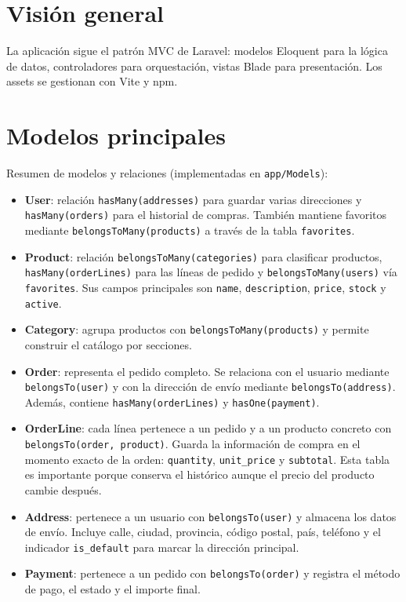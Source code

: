 \documentclass[12pt,a4paper]{report}
\begin{document}
\section{Visión general}

La aplicación sigue el patrón MVC de Laravel: modelos Eloquent para la lógica de datos, controladores para orquestación, vistas Blade para presentación. Los assets se gestionan con Vite y npm.

\section{Modelos principales}

Resumen de modelos y relaciones (implementadas en \texttt{app/Models}):

\begin{itemize}
  \item \textbf{User}: relación \texttt{hasMany(addresses)} para guardar varias direcciones y \texttt{hasMany(orders)} para el historial de compras. También mantiene favoritos mediante \texttt{belongsToMany(products)} a través de la tabla \texttt{favorites}.
  \item \textbf{Product}: relación \texttt{belongsToMany(categories)} para clasificar productos, \texttt{hasMany(orderLines)} para las líneas de pedido y \texttt{belongsToMany(users)} vía \texttt{favorites}. Sus campos principales son \texttt{name}, \texttt{description}, \texttt{price}, \texttt{stock} y \texttt{active}.
  \item \textbf{Category}: agrupa productos con \texttt{belongsToMany(products)} y permite construir el catálogo por secciones.
  \item \textbf{Order}: representa el pedido completo. Se relaciona con el usuario mediante \texttt{belongsTo(user)} y con la dirección de envío mediante \texttt{belongsTo(address)}. Además, contiene \texttt{hasMany(orderLines)} y \texttt{hasOne(payment)}.
  \item \textbf{OrderLine}: cada línea pertenece a un pedido y a un producto concreto con \texttt{belongsTo(order, product)}. Guarda la información de compra en el momento exacto de la orden: \texttt{quantity}, \texttt{unit\_price} y \texttt{subtotal}. Esta tabla es importante porque conserva el histórico aunque el precio del producto cambie después.
  \item \textbf{Address}: pertenece a un usuario con \texttt{belongsTo(user)} y almacena los datos de envío. Incluye calle, ciudad, provincia, código postal, país, teléfono y el indicador \texttt{is\_default} para marcar la dirección principal.
  \item \textbf{Payment}: pertenece a un pedido con \texttt{belongsTo(order)} y registra el método de pago, el estado y el importe final.
\end{itemize}
\end{document}
